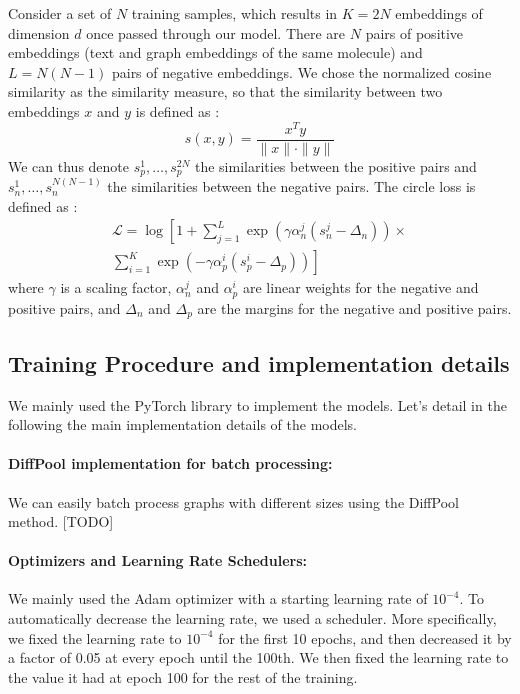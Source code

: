 \documentclass[switch, 12pt]{article}
\begin{document}
\begin{multicols}{2}
    Consider a set of $N$ training samples, which results in $K=2N$ embeddings of dimension $d$ once passed through our model. There are $N$ pairs of positive embeddings (text and graph embeddings of the same molecule) and $L=N(N-1)$ pairs of negative embeddings. We chose the normalized cosine similarity as the similarity measure, so that the similarity between two embeddings $x$ and $y$ is defined as :
    \begin{equation}
        s(x,y)=\frac{x^Ty}{\|x\|\cdot\|y\|}
    \end{equation}
    We can thus denote $s_p^1,\dots,s_p^{2N}$ the similarities between the positive pairs and $s_n^1,\dots,s_n^{N(N-1)}$ the similarities between the negative pairs. The circle loss is defined as :
    \begin{align*}
        \mathcal{L}=\log\left[1+\sum_{j=1}^{L}\exp(\gamma\alpha_{n}^{j}(s_{n}^{j}-\Delta_{n}))\times \right. \\ \left.\sum_{i=1}^{K}\exp(-\gamma\alpha_{p}^{i}(s_{p}^{i}-\Delta_{p}))\right]
    \end{align*}
    where $\gamma$ is a scaling factor, $\alpha_{n}^{j}$ and $\alpha_{p}^{i}$ are linear weights for the negative and positive pairs, and $\Delta_{n}$ and $\Delta_{p}$ are the margins for the negative and positive pairs.

    \subsection{Training Procedure and implementation details}
    We mainly used the PyTorch library to implement the models. Let's detail in the following the main implementation details of the models.
    \paragraph*{DiffPool implementation for batch processing: } We can easily batch process graphs with different sizes using the DiffPool method. [TODO]

    \paragraph*{Optimizers and Learning Rate Schedulers: } We mainly used the Adam optimizer with a starting learning rate of $10^{-4}$.
    To automatically decrease the learning rate, we used a scheduler. More specifically, we fixed the learning rate to $10^{-4}$ for the first 10 epochs, and then decreased it by a factor of 0.05 at every epoch until the 100th. We then fixed the learning rate to the value it had at epoch 100 for the rest of the training.


\end{multicols}
\end{document}
